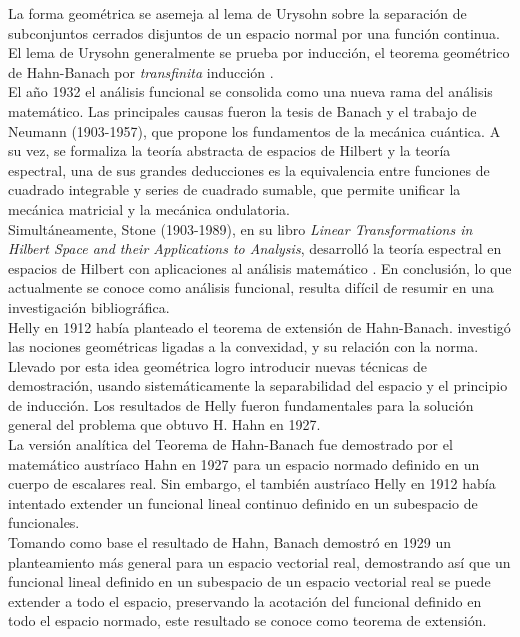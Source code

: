 \documentclass[10pt]{amsart}
\theoremstyle{remark}
\numberwithin{equation}{section}
\begin{document}
 La forma geométrica se asemeja al lema de Urysohn sobre la separación de subconjuntos cerrados disjuntos de un espacio normal por una función continua. El lema de Urysohn generalmente se prueba por inducción, el teorema geométrico de Hahn-Banach por \textit{transfinita} inducción \cite{libro10}.\\

El año 1932 el análisis funcional se consolida como una nueva rama del análisis matemático. Las principales causas fueron la tesis de Banach y el trabajo de Neumann (1903-1957), que propone los fundamentos de la mecánica cuántica. A su vez, se formaliza la teoría abstracta de espacios de Hilbert y la teoría espectral, una de sus grandes deducciones es la equivalencia entre funciones de cuadrado integrable y series de cuadrado sumable, que permite unificar la mecánica matricial y la mecánica ondulatoria.\\

Simultáneamente, Stone (1903-1989), en su libro  \textit{Linear Transformations in Hilbert Space and their Applications to Analysis}, desarrolló la teoría espectral en espacios de Hilbert con aplicaciones al análisis matemático \cite{ArtAca03}. En conclusión, lo que actualmente se conoce como análisis funcional, resulta difícil de resumir en una investigación bibliográfica.\\

Helly en 1912 había planteado el teorema de extensión de Hahn-Banach. investigó las nociones geométricas ligadas a la convexidad, y su relación con la norma. Llevado por esta idea geométrica logro introducir nuevas técnicas de demostración, usando sistemáticamente la separabilidad del espacio y el principio de inducción. Los resultados de Helly fueron fundamentales para la solución general del problema que obtuvo H. Hahn en 1927.\\

La versión analítica del Teorema de Hahn-Banach fue demostrado por el matemático austríaco Hahn en 1927 para un espacio normado definido en un cuerpo de escalares real. Sin embargo, el también austríaco Helly en 1912 había intentado extender un funcional lineal continuo definido en un subespacio de funcionales.\\

Tomando como base el resultado de Hahn, Banach demostró en 1929 un planteamiento más general para un espacio vectorial real, demostrando así que un funcional lineal definido en un subespacio de un espacio vectorial real se puede extender a todo el espacio, preservando la acotación del funcional definido en todo el espacio normado, este resultado se conoce como teorema de extensión.\\
\end{document}
